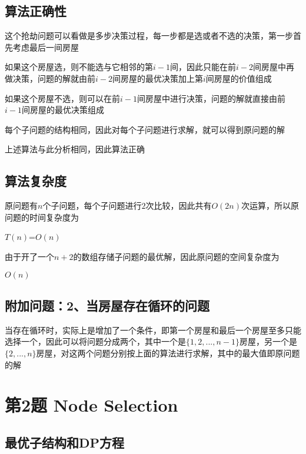 \documentclass{article}
\begin{document}
\subsection{算法正确性}
这个抢劫问题可以看做是多步决策过程，每一步都是选或者不选的决策，第一步首先考虑最后一间房屋
\par 如果这个房屋选，则不能选与它相邻的第$i-1$间，因此只能在前$i-2$间房屋中再做决策，问题的解就由前$i-2$间房屋的最优决策加上第$i$间房屋的价值组成
\par 如果这个房屋不选，则可以在前$i-1$间房屋中进行决策，问题的解就直接由前$i-1$间房屋的最优决策组成
\par 每个子问题的结构相同，因此对每个子问题进行求解，就可以得到原问题的解
\par 上述算法与此分析相同，因此算法正确

\subsection{算法复杂度}
原问题有$n$个子问题，每个子问题进行$2$次比较，因此共有$O(2n)$次运算，所以原问题的时间复杂度为
\begin{center}
    $T(n)$=$O(n)$ 
\end{center} 
\par 由于开了一个$n+2$的数组存储子问题的最优解，因此原问题的空间复杂度为
\begin{center}
    $O(n)$
\end{center} 

\subsection{附加问题：2、当房屋存在循环的问题}
当存在循环时，实际上是增加了一个条件，即第一个房屋和最后一个房屋至多只能选择一个，因此可以将问题分成两个，其中一个是$\{1,2,...,n-1\}$房屋，另一个是$\{2,...,n\}$房屋，对这两个问题分别按上面的算法进行求解，其中的最大值即原问题的解

\section{第2题 Node Selection}
\subsection{最优子结构和DP方程}
\end{document}
